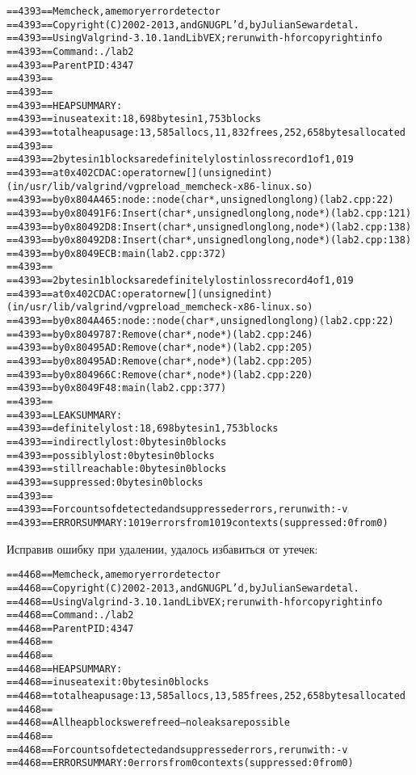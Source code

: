 \documentclass[12pt]{article}
\begin{document}
	\begin{alltt}
		==4393== Memcheck, a memory error detector
		==4393== Copyright (C) 2002-2013, and GNU GPL'd, by Julian Seward et al.
		==4393== Using Valgrind-3.10.1 and LibVEX; rerun with -h for copyright info
		==4393== Command: ./lab2
		==4393== Parent PID: 4347
		==4393== 
		==4393== 
		==4393== HEAP SUMMARY:
		==4393==     in use at exit: 18,698 bytes in 1,753 blocks
		==4393==   total heap usage: 13,585 allocs, 11,832 frees, 252,658 bytes allocated
		==4393== 
		==4393== 2 bytes in 1 blocks are definitely lost in loss record 1 of 1,019
		==4393==    at 0x402CDAC: operator new[](unsigned int) (in /usr/lib/valgrind/vgpreload_memcheck-x86-linux.so)
		==4393==    by 0x804A465: node::node(char*, unsigned long long) (lab2.cpp:22)
		==4393==    by 0x80491F6: Insert(char*, unsigned long long, node*) (lab2.cpp:121)
		==4393==    by 0x80492D8: Insert(char*, unsigned long long, node*) (lab2.cpp:138)
		==4393==    by 0x80492D8: Insert(char*, unsigned long long, node*) (lab2.cpp:138)
		==4393==    by 0x8049ECB: main (lab2.cpp:372)
		==4393== 
		==4393== 2 bytes in 1 blocks are definitely lost in loss record 4 of 1,019
		==4393==    at 0x402CDAC: operator new[](unsigned int) (in /usr/lib/valgrind/vgpreload_memcheck-x86-linux.so)
		==4393==    by 0x804A465: node::node(char*, unsigned long long) (lab2.cpp:22)
		==4393==    by 0x8049787: Remove(char*, node*) (lab2.cpp:246)
		==4393==    by 0x80495AD: Remove(char*, node*) (lab2.cpp:205)
		==4393==    by 0x80495AD: Remove(char*, node*) (lab2.cpp:205)
		==4393==    by 0x804966C: Remove(char*, node*) (lab2.cpp:220)
		==4393==    by 0x8049F48: main (lab2.cpp:377)
		==4393== 
		==4393== LEAK SUMMARY:
		==4393==    definitely lost: 18,698 bytes in 1,753 blocks
		==4393==    indirectly lost: 0 bytes in 0 blocks
		==4393==      possibly lost: 0 bytes in 0 blocks
		==4393==    still reachable: 0 bytes in 0 blocks
		==4393==         suppressed: 0 bytes in 0 blocks
		==4393== 
		==4393== For counts of detected and suppressed errors, rerun with: -v
		==4393== ERROR SUMMARY: 1019 errors from 1019 contexts (suppressed: 0 from 0)
	\end{alltt}
	Исправив ошибку при удалении, удалось избавиться от утечек:
	\begin{alltt}
		==4468== Memcheck, a memory error detector
		==4468== Copyright (C) 2002-2013, and GNU GPL'd, by Julian Seward et al.
		==4468== Using Valgrind-3.10.1 and LibVEX; rerun with -h for copyright info
		==4468== Command: ./lab2
		==4468== Parent PID: 4347
		==4468== 
		==4468== 
		==4468== HEAP SUMMARY:
		==4468==     in use at exit: 0 bytes in 0 blocks
		==4468==   total heap usage: 13,585 allocs, 13,585 frees, 252,658 bytes allocated
		==4468== 
		==4468== All heap blocks were freed -- no leaks are possible
		==4468== 
		==4468== For counts of detected and suppressed errors, rerun with: -v
		==4468== ERROR SUMMARY: 0 errors from 0 contexts (suppressed: 0 from 0)\\
	\end{alltt}
	 
\end{document}
